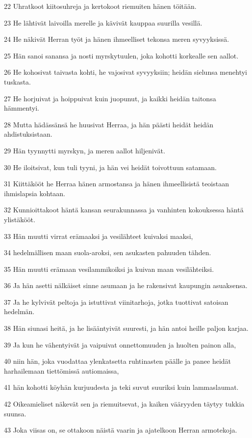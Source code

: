 \par 22 Uhratkoot kiitosuhreja ja kertokoot riemuiten hänen töitään.
\par 23 He lähtivät laivoilla merelle ja kävivät kauppaa suurilla vesillä.
\par 24 He näkivät Herran työt ja hänen ihmeelliset tekonsa meren syvyyksissä.
\par 25 Hän sanoi sanansa ja nosti myrskytuulen, joka kohotti korkealle sen aallot.
\par 26 He kohosivat taivasta kohti, he vajosivat syvyyksiin; heidän sielunsa menehtyi tuskasta.
\par 27 He horjuivat ja hoippuivat kuin juopunut, ja kaikki heidän taitonsa hämmentyi.
\par 28 Mutta hädässänsä he huusivat Herraa, ja hän päästi heidät heidän ahdistuksistaan.
\par 29 Hän tyynnytti myrskyn, ja meren aallot hiljenivät.
\par 30 He iloitsivat, kun tuli tyyni, ja hän vei heidät toivottuun satamaan.
\par 31 Kiittäkööt he Herraa hänen armostansa ja hänen ihmeellisistä teoistaan ihmislapsia kohtaan.
\par 32 Kunnioittakoot häntä kansan seurakunnassa ja vanhinten kokouksessa häntä ylistäkööt.
\par 33 Hän muutti virrat erämaaksi ja vesilähteet kuivaksi maaksi,
\par 34 hedelmällisen maan suola-aroksi, sen asukasten pahuuden tähden.
\par 35 Hän muutti erämaan vesilammikoiksi ja kuivan maan vesilähteiksi.
\par 36 Ja hän asetti nälkäiset sinne asumaan ja he rakensivat kaupungin asuaksensa.
\par 37 Ja he kylvivät peltoja ja istuttivat viinitarhoja, jotka tuottivat satoisan hedelmän.
\par 38 Hän siunasi heitä, ja he lisääntyivät suuresti, ja hän antoi heille paljon karjaa.
\par 39 Ja kun he vähentyivät ja vaipuivat onnettomuuden ja huolten painon alla,
\par 40 niin hän, joka vuodattaa ylenkatsetta ruhtinasten päälle ja panee heidät harhailemaan tiettömissä autiomaissa,
\par 41 hän kohotti köyhän kurjuudesta ja teki suvut suuriksi kuin lammaslaumat.
\par 42 Oikeamieliset näkevät sen ja riemuitsevat, ja kaiken vääryyden täytyy tukkia suunsa.
\par 43 Joka viisas on, se ottakoon näistä vaarin ja ajatelkoon Herran armotekoja.

